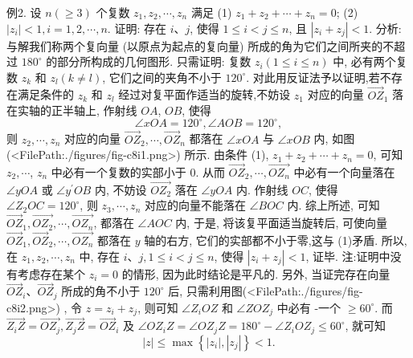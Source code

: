 例2. 设 $n(\geqslant 3)$ 个复数 $z_1, z_2, \cdots, z_n$ 满足
(1) $z_1+z_2+\cdots+z_n=0$;
(2) $\left|z_i\right|<1, i=1,2, \cdots, n$.
证明: 存在 $i 、 j$, 使得 $1 \leqslant i<j \leqslant n$, 且 $\left|z_i+z_j\right|<1$.
分析:与解我们称两个复向量 (以原点为起点的复向量) 所成的角为它们之间所夹的不超过 $180^{\circ}$ 的部分所构成的几何图形.
只需证明: 复数 $z_i(1 \leqslant i \leqslant n)$ 中, 必有两个复数 $z_k$ 和 $z_l(k \neq l)$, 它们之间的夹角不小于 $120^{\circ}$.
对此用反证法予以证明,若不存在满足条件的 $z_k$ 和 $z_l$ 经过对复平面作适当的旋转,不妨设 $z_1$ 对应的向量 $\overrightarrow{O Z}_1$ 落在实轴的正半轴上, 作射线 $O A$, $O B$, 使得
$$
\angle x O A=120^{\circ}, \angle A O B=120^{\circ},
$$
则 $z_2, \cdots, z_n$ 对应的向量 $\overrightarrow{O Z}_2, \cdots, \overrightarrow{O Z}_n$ 都落在 $\angle x O A$ 与 $\angle x O B$ 内, 如图(<FilePath:./figures/fig-c8i1.png>) 所示.
由条件 (1), $z_1+z_2+\cdots+z_n=0$, 可知 $z_2, \cdots$, $z_n$ 中必有一个复数的实部小于 0. 从而 $\overrightarrow{O Z}_2, \cdots, \overrightarrow{O Z_n}$ 中必有一个向量落在 $\angle y O A$ 或 $\angle y^{\prime} O B$ 内, 不妨设 $\overrightarrow{O Z_2}$ 落在 $\angle y O A$ 内.
作射线 $O C$, 使得 $\angle Z_2 O C= 120^{\circ}$, 则 $z_3, \cdots, z_n$ 对应的向量不能落在 $\angle B O C$ 内.
综上所述, 可知 $\overrightarrow{O Z}_1, \overrightarrow{O Z_2}, \cdots, \overrightarrow{O Z_n}$, 都落在 $\angle A O C$ 内, 于是, 将该复平面适当旋转后, 可使向量 $\overrightarrow{O Z}_1, \overrightarrow{O Z}_2, \cdots, \overrightarrow{O Z_n}$ 都落在 $y$ 轴的右方, 它们的实部都不小于零,这与 (1)矛盾.
所以, 在 $z_1, z_2, \cdots, z_n$ 中, 存在 $i 、 j, 1 \leqslant i<j \leqslant n$, 使得 $\left|z_i+z_j\right|<1$, 证毕.
注:证明中没有考虑存在某个 $z_i=0$ 的情形, 因为此时结论是平凡的.
另外, 当证完存在向量 $\overrightarrow{O Z}_i 、 \overrightarrow{O Z}_j$ 所成的角不小于 $120^{\circ}$ 后, 只需利用图(<FilePath:./figures/fig-c8i2.png>) , 令 $z=z_i+z_j$, 则可知 $\angle Z_i O Z$ 和 $\angle Z O Z_j$ 中必有 -一个 $\geqslant 60^{\circ}$. 而 $\overrightarrow{Z_i Z}=\overrightarrow{O Z_j}, \overrightarrow{Z_j Z}=\overrightarrow{O Z}_i$ 及 $\angle O Z_i Z= \angle O Z_j Z=180^{\circ}-\angle Z_i O Z_j \leqslant 60^{\circ}$, 就可知
$$
|z| \leqslant \max \left\{\left|z_i\right|,\left|z_j\right|\right\}<1 .
$$



